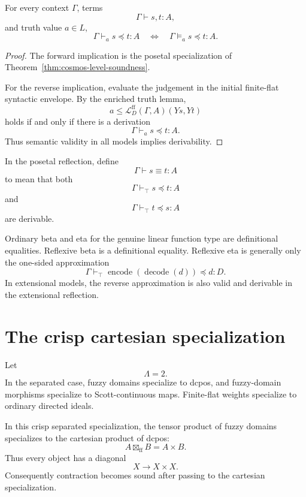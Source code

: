 \begin{theorem}
\label{thm:posetal-soundness-completeness-affine-linear}
For every context \(\Gamma\), terms
\[
    \Gamma\vdash s,t:A,
\]
and truth value \(a\in L\),
\[
    \Gamma\vdash_a s\preceq t:A
    \quad\Longleftrightarrow\quad
    \Gamma\models_a s\preceq t:A.
\]
\end{theorem}

\begin{proof}
The forward implication is the posetal specialization of
Theorem~\ref{thm:cosmos-level-soundness}.

For the reverse implication, evaluate the judgement in the initial
finite-flat syntactic envelope.  By the enriched truth lemma,
\[
    a
    \leq
    \mathcal L_D^{\mathrm{ff}}(\Gamma,A)(Ys,Yt)
\]
holds if and only if there is a derivation
\[
    \Gamma\vdash_a s\preceq t:A.
\]
Thus semantic validity in all models implies derivability.
\end{proof}

\begin{definition}
\label{def:top-degree-definitional-equality-posetal}
In the posetal reflection, define
\[
    \Gamma\vdash s\equiv t:A
\]
to mean that both
\[
    \Gamma\vdash_{\top} s\preceq t:A
\]
and
\[
    \Gamma\vdash_{\top} t\preceq s:A
\]
are derivable.
\end{definition}

Ordinary beta and eta for the genuine linear function type are definitional
equalities.  Reflexive beta is a definitional equality.  Reflexive eta is
generally only the one-sided approximation
\[
    \Gamma
    \vdash_{\top}
    \operatorname{encode}(\operatorname{decode}(d))
    \preceq
    d
    :
    D.
\]
In extensional models, the reverse approximation is also valid and derivable
in the extensional reflection.

\section{The crisp cartesian specialization}
\label{sec:crisp-cartesian-specialization-affine-linear}

Let
\[
    \Lambda=2.
\]
In the separated case, fuzzy domains specialize to dcpos, and fuzzy-domain
morphisms specialize to Scott-continuous maps.  Finite-flat weights specialize
to ordinary directed ideals.

In this crisp separated specialization, the tensor product of fuzzy domains
specializes to the cartesian product of dcpos:
\[
    A\boxtimes_{\mathrm{ff}}B
    =
    A\times B.
\]
Thus every object has a diagonal
\[
    X\longrightarrow X\times X.
\]
Consequently contraction becomes sound after passing to the cartesian
specialization.

